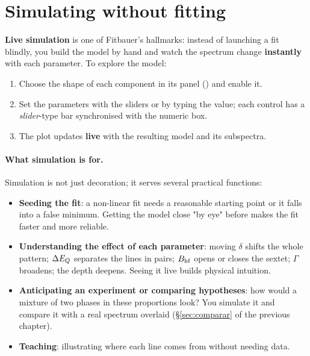 \section{Simulating without fitting}

\textbf{Live simulation} is one of Fitbauer's hallmarks: instead of launching a
fit blindly, you build the model by hand and watch the spectrum change
\textbf{instantly} with each parameter. To explore the model:

\begin{enumerate}[nosep]
  \item Choose the shape of each component in its panel () and enable it.
  \item Set the parameters with the sliders or by typing the value;
        each control has a \emph{slider}-type bar synchronised with the numeric
        box.
  \item The plot updates \textbf{live} with the resulting model and its
        subspectra.
\end{enumerate}

\paragraph{What simulation is for.} Simulation is not just decoration; it serves
several practical functions:

\begin{itemize}[nosep]
  \item \textbf{Seeding the fit}: a non-linear fit needs a reasonable starting
        point or it falls into a false minimum. Getting the model close "by eye"
        before  makes the fit faster and more reliable.
  \item \textbf{Understanding the effect of each parameter}: moving $\delta$
        shifts the whole pattern; $\Delta E_{Q}$ separates the lines in pairs; $B_{\mathrm{hf}}$
        opens or closes the sextet; $\Gamma$ broadens; the depth deepens. Seeing
        it live builds physical intuition.
  \item \textbf{Anticipating an experiment or comparing hypotheses}: how would a
        mixture of two phases in these proportions look? You simulate it and
        compare it with a real spectrum overlaid (§\ref{sec:comparar} of the
        previous chapter).
  \item \textbf{Teaching}: illustrating where each line comes from without needing
        data.
\end{itemize}

